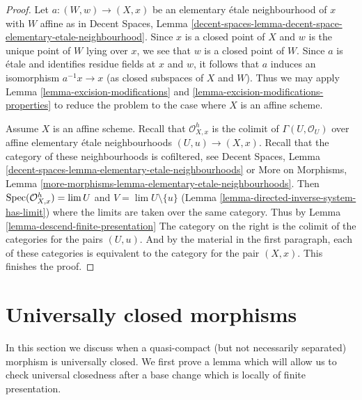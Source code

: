 \begin{proof}
Let $a : (W, w) \to (X, x)$ be an elementary \'etale neighbourhood of $x$
with $W$ affine as in
Decent Spaces, Lemma
\ref{decent-spaces-lemma-decent-space-elementary-etale-neighbourhood}.
Since $x$ is a closed point of $X$ and $w$ is the unique point of $W$
lying over $x$, we see that $w$ is a closed point of $W$. Since $a$
is \'etale and identifies residue fields at $x$ and $w$, it
follows that $a$ induces an isomorphism $a^{-1}x \to x$ (as closed
subspaces of $X$ and $W$). Thus we may apply
Lemma \ref{lemma-excision-modifications} and
\ref{lemma-excision-modifications-properties}
to reduce the problem to the case where $X$ is an affine scheme.

\medskip\noindent
Assume $X$ is an affine scheme. Recall that $\mathcal{O}_{X, x}^h$
is the colimit of $\Gamma(U, \mathcal{O}_U)$ over affine
elementary \'etale neighbourhoods $(U, u) \to (X, x)$.
Recall that the category of these neighbourhoods is
cofiltered, see Decent Spaces, Lemma
\ref{decent-spaces-lemma-elementary-etale-neighbourhoods} or
More on Morphisms, Lemma
\ref{more-morphisms-lemma-elementary-etale-neighbourhoods}.
Then $\mathop{\mathrm{Spec}}(\mathcal{O}_{X, x}^h) = \mathop{\mathrm{lim}}\nolimits U$ and
$V = \lim U \setminus \{u\}$
(Lemma \ref{lemma-directed-inverse-system-has-limit})
where the limits are taken over the same category. Thus by
Lemma \ref{lemma-descend-finite-presentation}
The category on the right is the colimit of the categories
for the pairs $(U, u)$. And by the material in the first
paragraph, each of these categories is equivalent to the
category for the pair $(X, x)$. This finishes the proof.
\end{proof}






\section{Universally closed morphisms}
\label{section-universally-closed}

\noindent
In this section we discuss when a quasi-compact (but not necessarily
separated) morphism is universally closed. We first prove a lemma which
will allow us to check universal closedness after a base change
which is locally of finite presentation.

